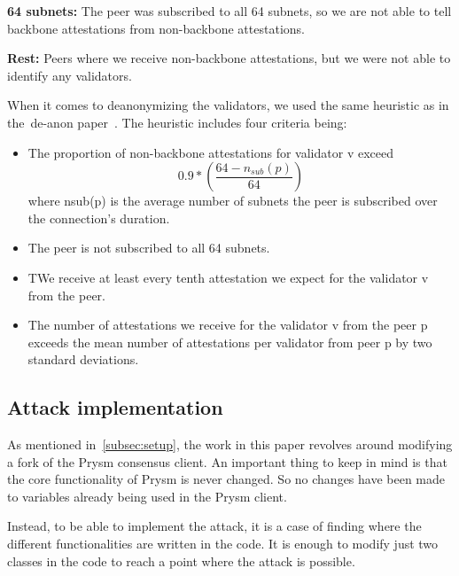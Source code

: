 \textbf{64 subnets:} The peer was subscribed to all 64 subnets, so we are not able to tell backbone attestations from non-backbone attestations.

\textbf{Rest:} Peers where we receive non-backbone attestations, but we were not able to identify any validators.

When it comes to deanonymizing the validators, we used the same heuristic as in the~\gls{de-anon paper}~\cite{heimbach2024deanonymizingethereumvalidatorsp2p}.
The heuristic includes four criteria being:
\begin{itemize}
    \item The proportion of non-backbone attestations for validator v exceed
    \begin{equation}
                                                                                 0.9*\left(\frac{64-n_{sub}(p)}{64}\right)
                                                                                 \label{eq:heurestic}
    \end{equation} where nsub(p) is the average number of subnets the peer is subscribed over the connection’s duration.
    \item The peer is not subscribed to all 64 subnets.
    \item TWe receive at least every tenth attestation we expect for the validator v from the peer.
    \item The number of attestations we receive for the validator v from the peer p exceeds the mean number of attestations per validator from peer p by two standard deviations.
\end{itemize}

\subsection{Attack implementation}\label{subsec:attack-implementation}
As mentioned in~\autoref{subsec:setup},
the work in this paper revolves around modifying a fork of the Prysm consensus client.
An important thing to keep in mind is that the core functionality of Prysm is never changed.
So no changes have been made to variables already being used in the Prysm client.

Instead, to be able to implement the attack,
it is a case of finding where the different functionalities are written in the code.
It is enough to modify just two classes in the code to reach a point where the attack is possible.

